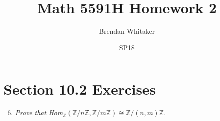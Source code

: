 \documentclass[10pt,oneside,reqno]{amsart}
\theoremstyle{plain}
\newcommand{\z}{\mathbb{Z}}
\theoremstyle{definition}
\theoremstyle{remark}
\begin{document}
\title{Math 5591H Homework 2}

\date{SP18}

\author[Brendan Whitaker]{Brendan Whitaker}

\maketitle



\section*{Section 10.2 Exercises}



\begin{enumerate}[label=\arabic*.]
\setcounter{enumi}{5}
\item \textit{Prove that Hom$_\z(\z/n\z,\z/m\z) \cong \z/(n,m)\z$. }


\end{enumerate}
\end{document}
